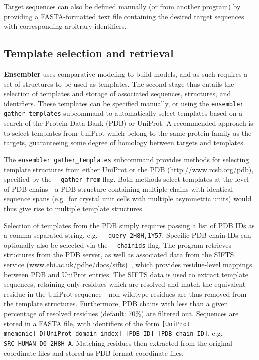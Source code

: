 \documentclass[aps,pre,twocolumn,nofootinbib,superscriptaddress,linenumbers]{revtex4-1}
\begin{document}
Target sequences can also be defined manually (or from another program) by providing a FASTA-formatted text file containing the desired target sequences with corresponding arbitrary identifiers.

\subsection{Template selection and retrieval}

{\bf Ensembler} uses comparative modeling to build models, and as such requires a set of structures to be used as templates.
The second stage thus entails the selection of templates and storage of associated sequences, structures, and identifiers.
These templates can be specified manually, or using the {\tt ensembler gather\_templates} subcommand to automatically select templates based on a search of the Protein Data Bank (PDB) or UniProt.
A recommended approach is to select templates from UniProt which belong to the same protein family as the targets, guaranteeing some degree of homology between targets and templates.

The {\tt ensembler gather\_templates} subcommand provides methods for selecting template structures from either UniProt or the PDB (\url{http://www.rcsb.org/pdb}), specified by the {\tt -{}-gather\_from} flag.
Both methods select templates at the level of PDB chains---a PDB structure containing multiple chains with identical sequence spans (e.g.~for crystal unit cells with multiple asymmetric units) would thus give rise to multiple template structures.

Selection of templates from the PDB simply requires passing a list of PDB IDs as a comma-separated string, e.g.~{\tt -{}-query 2H8H,1Y57}.
Specific PDB chain IDs can optionally also be selected via the {\tt -{}-chainids} flag.
The program retrieves structures from the PDB server, as well as associated data from the SIFTS service (\href{http://www.ebi.ac.uk/pdbe/docs/sifts/}{www.ebi.ac.uk/pdbe/docs/sifts})~\cite{velankar:2013:sifts}, which provides residue-level mappings between PDB and UniProt entries.
The SIFTS data is used to extract template sequences, retaining only residues which are resolved and match the equivalent residue in the UniProt sequence---non-wildtype residues are thus removed from the template structures.
Furthermore, PDB chains with less than a given percentage of resolved residues (default: 70\%) are filtered out.
Sequences are stored in a FASTA file, with identifiers of the form {\tt [UniProt mnemonic]\_D[UniProt domain index]\_[PDB ID]\_[PDB chain ID]}, e.g. {\tt SRC\_HUMAN\_D0\_2H8H\_A}.
Matching residues then extracted from the original coordinate files and stored as PDB-format coordinate files.
\end{document}
